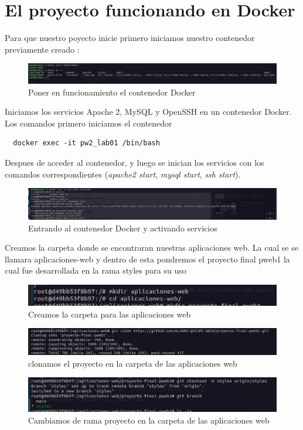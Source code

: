 \section{El proyecto funcionando en Docker}
Para que nuestro poyecto inicie primero iniciamos nuestro contenedor previamente creado :
\begin{figure}[H]
  \centering
  \includegraphics[width=1.0\textwidth]{img/Iniciando_Docker.png}
  \caption{Poner en funcionamiento el contenedor Docker}
\end{figure}
Iniciamos los servicios Apache 2, MySQL y OpenSSH en un contenedor Docker. Los comandos primero iniciamos el contenedor 
\begin{verbatim}
  docker exec -it pw2_lab01 /bin/bash 
\end{verbatim}
\hspace{0.5cm}Despues de acceder al contenedor, y luego se inician los servicios con los comandos correspondientes 
(\textit{apache2 start}, \textit{mysql start}, \textit{ssh start}).
\begin{figure}[H]
  \centering
  \includegraphics[width=1.0\textwidth]{img/Activamos_servicios.png}
  \caption{Entrando al contenedor Docker y activando servicios}
\end{figure}


Creamos la carpeta donde se encontraran nuestras aplicaciones web. La cual se se llamara aplicaciones-web y dentro de esta pondremos el 
proyecto final pweb1 la cual fue desarrollada en la rama styles para su uso 
\begin{figure}[H]
  \centering
  \includegraphics[width=1.0\textwidth]{img/Creamos_carpeta.png}
  \caption{Creamos la carpeta para las aplicaciones web}
\end{figure}
\begin{figure}[H]
  \centering
  \includegraphics[width=1.0\textwidth]{img/Clonamos_proyecto.png}
  \caption{clonamos el proyecto en la carpeta de las aplicaciones web}
\end{figure}
\begin{figure}[H]
  \centering
  \includegraphics[width=1.0\textwidth]{img/Cambiando_Rama.png}
  \caption{Cambiamos de rama proyecto en la carpeta de las aplicaciones web}
\end{figure}

